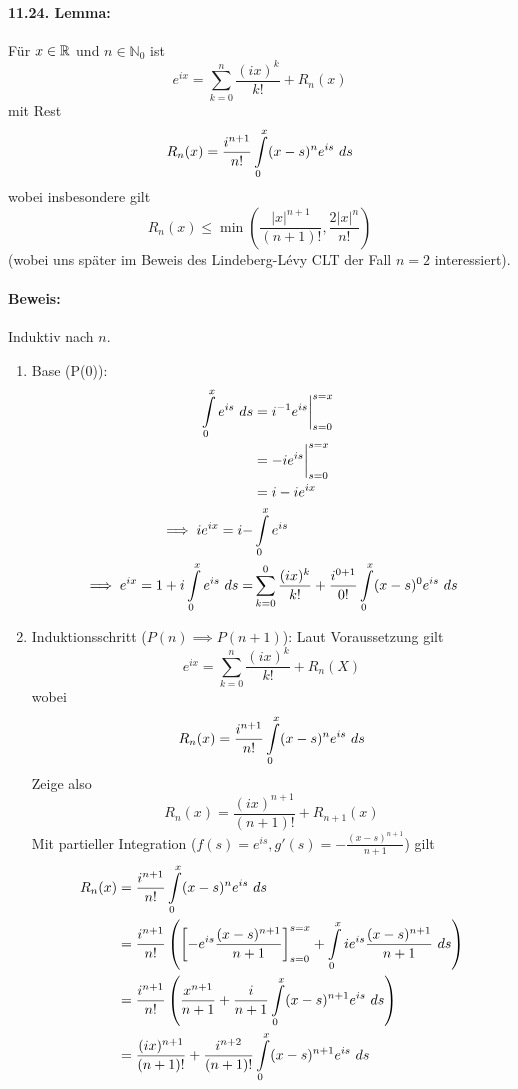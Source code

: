  \paragraph{11.24. Lemma:} F\"ur $x\in\mathbb{R}$ und $n\in\mathbb{N}_0$ ist 
 $$e^{ix}=\sum_{k=0}^n\dfrac{(ix)^k}{k!}+R_n(x)$$
 mit Rest
 $$R_n(x)=\dfrac{i^{n+1}}{n!}\int\displaylimits_0^x(x-s)^ne^{is}\ ds$$
 wobei insbesondere gilt
 $$R_n(x)\leq\min\left(\dfrac{|x|^{n+1}}{(n+1)!},\dfrac{2|x|^n}{n!}\right)$$
 (wobei uns sp\"ater im Beweis des Lindeberg-L\'evy CLT der Fall $n=2$ interessiert).
 
 \paragraph{Beweis:} Induktiv nach $n$.
 \begin{enumerate}
     \item Base (P(0)):
     \begin{align*}
         \int\displaylimits_0^xe^{is}\ ds&=i^{-1}e^{is}\bigg|_{s=0}^{s=x}\\
         &=-ie^{is}\bigg|_{s=0}^{s=x}\\
         &=i-ie^{ix} \\
         \implies ie^{ix}=i-&\int\displaylimits_0^xe^{is}\\
         \implies e^{ix}=1+i\int\displaylimits_0^xe^{is}\ ds=&\sum_{k=0}^0\dfrac{(ix)^k}{k!}+\dfrac{i^{0+1}}{0!}\int\displaylimits_0^x(x-s)^0e^{is}\ ds
     \end{align*}
     \item Induktionsschritt ($P(n)\implies P(n+1)$): Laut Voraussetzung gilt 
     $$e^{ix}=\sum_{k=0}^n\dfrac{(ix)^k}{k!}+R_n(X)$$
     wobei 
     $$R_n(x)=\dfrac{i^{n+1}}{n!}\int\displaylimits_0^x(x-s)^ne^{is}\ ds$$
     Zeige also 
     $$R_n(x)=\dfrac{(ix)^{n+1}}{(n+1)!}+R_{n+1}(x)$$
     Mit partieller Integration ($f(s)=e^{is}, g'(s)=-\frac{(x-s)^{n+1}}{n+1}$) gilt
     \begin{align*}
         R_n(x)&=\dfrac{i^{n+1}}{n!}\int\displaylimits_0^x(x-s)^ne^{is}\ ds \\
         &=\dfrac{i^{n+1}}{n!}\left(\left[-e^{is}\dfrac{(x-s)^{n+1}}{n+1}\right]_{s=0}^{s=x}+\int\displaylimits_0^xie^{is}\dfrac{(x-s)^{n+1}}{n+1}\ ds\right)\\ 
         &=\dfrac{i^{n+1}}{n!}\left(\dfrac{x^{n+1}}{n+1}+\dfrac{i}{n+1}\int\displaylimits_0^x(x-s)^{n+1}e^{is}\ ds \right) \\
         &=\dfrac{(ix)^{n+1}}{(n+1)!}+\dfrac{i^{n+2}}{(n+1)!}\int\displaylimits_0^x(x-s)^{n+1}e^{is}\ ds\\

\end{align*}
\end{enumerate}
